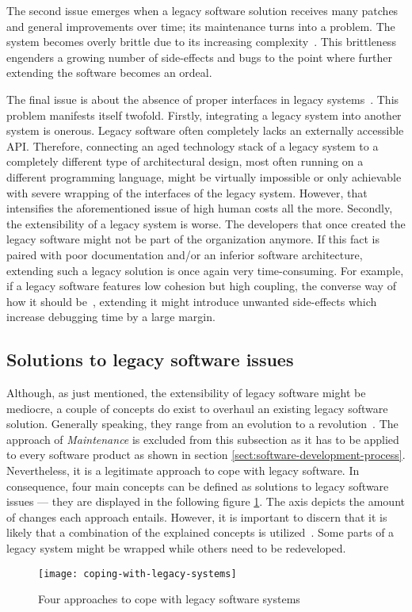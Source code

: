 \documentclass[12pt,a4paper,twoside]{report}
\begin{document}
The second issue emerges when a legacy software solution receives many
patches and general improvements over time; its maintenance
turns into a problem. The system becomes overly brittle due to its
increasing complexity~\cite{seacord-modernizing-legacy, tilley-perspectives-reengineering}.
This brittleness engenders a growing number of side-effects and bugs
to the point where further extending the software becomes an ordeal.

The final issue is about the absence of proper interfaces
in legacy systems~\cite{bisbal-legacy-issues}. This problem manifests itself twofold.
Firstly, integrating a legacy system into another system is onerous.
Legacy software often completely lacks an externally accessible API.
Therefore, connecting an aged technology stack of a legacy system to a completely
different type of architectural design, most often running on a different programming language,
might be virtually impossible or only achievable with severe wrapping
of the interfaces of the legacy system. However, that intensifies the aforementioned
issue of high human costs all the more.
Secondly, the extensibility of a legacy system is worse.
The developers that once created the legacy software might not be part of the
organization anymore. If this fact is paired with poor documentation and/or
an inferior software architecture, extending such a legacy solution is once again
very time-consuming. For example, if a legacy software features
low cohesion but high coupling, the converse way of how it should be~\cn,
extending it might introduce unwanted side-effects which increase debugging
time by a large margin.


\subsection{Solutions to legacy software issues}

Although, as just mentioned, the extensibility of legacy software might be mediocre,
a couple of concepts do exist to overhaul an existing legacy software solution.
Generally speaking, they range from an evolution to a revolution~\cite{bisbal-legacy-issues}.
The approach of \textit{Maintenance} is excluded from this subsection as it
has to be applied to every software product as shown in section \ref{sect:software-development-process}.
Nevertheless, it is a legitimate approach to cope with legacy software.
In consequence, four main concepts can be defined as solutions to legacy software issues ---
they are displayed in the following figure \ref{fig:coping-legacy}.
The axis depicts the amount of changes each approach entails.
However, it is important to discern that it is likely that a combination of
the explained concepts is utilized~\cite{bisbal-legacy-issues}.
Some parts of a legacy system might be wrapped while others need to be redeveloped.
\begin{figure}[htbp]
\centering
\texttt{[image: coping-with-legacy-systems]}
\caption{Four approaches to cope with legacy software systems~\cite{bisbal-legacy-issues}}
\label{fig:coping-legacy}
\end{figure}
\end{document}
